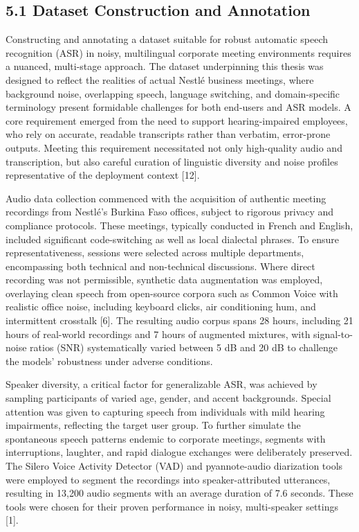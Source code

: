 \documentclass[12pt,a4paper]{article}
\begin{document}
\subsection{5.1 Dataset Construction and Annotation}


Constructing and annotating a dataset suitable for robust automatic speech recognition (ASR) in noisy, multilingual corporate meeting environments requires a nuanced, multi-stage approach. The dataset underpinning this thesis was designed to reflect the realities of actual Nestlé business meetings, where background noise, overlapping speech, language switching, and domain-specific terminology present formidable challenges for both end-users and ASR models. A core requirement emerged from the need to support hearing-impaired employees, who rely on accurate, readable transcripts rather than verbatim, error-prone outputs. Meeting this requirement necessitated not only high-quality audio and transcription, but also careful curation of linguistic diversity and noise profiles representative of the deployment context [12].


Audio data collection commenced with the acquisition of authentic meeting recordings from Nestlé’s Burkina Faso offices, subject to rigorous privacy and compliance protocols. These meetings, typically conducted in French and English, included significant code-switching as well as local dialectal phrases. To ensure representativeness, sessions were selected across multiple departments, encompassing both technical and non-technical discussions. Where direct recording was not permissible, synthetic data augmentation was employed, overlaying clean speech from open-source corpora such as Common Voice with realistic office noise, including keyboard clicks, air conditioning hum, and intermittent crosstalk [6]. The resulting audio corpus spans 28 hours, including 21 hours of real-world recordings and 7 hours of augmented mixtures, with signal-to-noise ratios (SNR) systematically varied between 5 dB and 20 dB to challenge the models’ robustness under adverse conditions.


Speaker diversity, a critical factor for generalizable ASR, was achieved by sampling participants of varied age, gender, and accent backgrounds. Special attention was given to capturing speech from individuals with mild hearing impairments, reflecting the target user group. To further simulate the spontaneous speech patterns endemic to corporate meetings, segments with interruptions, laughter, and rapid dialogue exchanges were deliberately preserved. The Silero Voice Activity Detector (VAD) and pyannote-audio diarization tools were employed to segment the recordings into speaker-attributed utterances, resulting in 13,200 audio segments with an average duration of 7.6 seconds. These tools were chosen for their proven performance in noisy, multi-speaker settings [1].
\end{document}

